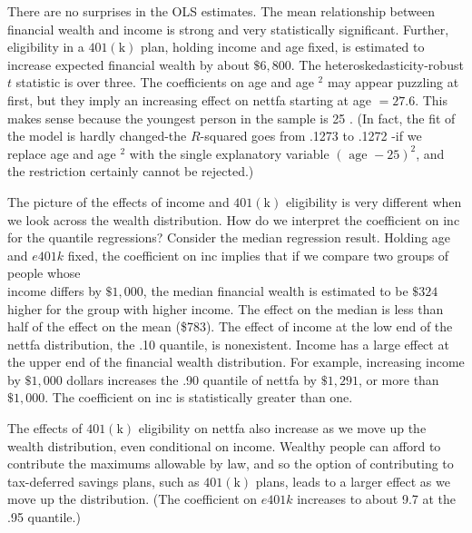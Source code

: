 \documentclass[10pt]{article}
\begin{document}
There are no surprises in the OLS estimates. The mean relationship between financial wealth and income is strong and very statistically significant. Further, eligibility in a $401(\mathrm{k})$ plan, holding income and age fixed, is estimated to increase expected financial wealth by about $\$ 6,800$. The heteroskedasticity-robust $t$ statistic is over three. The coefficients on age and age ${ }^{2}$ may appear puzzling at first, but they imply an increasing effect on nettfa starting at age $=27.6$. This makes sense because the youngest person in the sample is 25 . (In fact, the fit of the model is hardly changed-the $R$-squared goes from .1273 to .1272 -if we replace age and age $^{2}$ with the single explanatory variable $(\text { age }-25)^{2}$, and the restriction certainly cannot be rejected.)

The picture of the effects of income and $401(\mathrm{k})$ eligibility is very different when we look across the wealth distribution. How do we interpret the coefficient on inc for the quantile regressions? Consider the median regression result. Holding age and $e 401 k$ fixed, the coefficient on inc implies that if we compare two groups of people whose\\
income differs by $\$ 1,000$, the median financial wealth is estimated to be $\$ 324$ higher for the group with higher income. The effect on the median is less than half of the effect on the mean (\$783). The effect of income at the low end of the nettfa distribution, the .10 quantile, is nonexistent. Income has a large effect at the upper end of the financial wealth distribution. For example, increasing income by $\$ 1,000$ dollars increases the .90 quantile of nettfa by $\$ 1,291$, or more than $\$ 1,000$. The coefficient on inc is statistically greater than one.

The effects of $401(\mathrm{k})$ eligibility on nettfa also increase as we move up the wealth distribution, even conditional on income. Wealthy people can afford to contribute the maximums allowable by law, and so the option of contributing to tax-deferred savings plans, such as $401(\mathrm{k})$ plans, leads to a larger effect as we move up the distribution. (The coefficient on $e 401 k$ increases to about 9.7 at the .95 quantile.)
\end{document}
